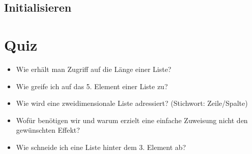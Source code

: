 \subsection{Initialisieren}
\begin{frame}
	\slidehead
	\vskip -12pt
\end{frame}

\subsection{}
\livecoding

\section{Quiz}
\begin{frame}
	\slidehead

	\begin{itemize}
		\item Wie erhält man Zugriff auf die Länge einer Liste?
		\pause
		\item Wie greife ich auf das 5. Element einer Liste zu?
		\pause
		\item Wie wird eine zweidimensionale Liste adressiert? (Stichwort: Zeile/Spalte)
		\pause
		\item Wofür benötigen wir  und warum erzielt eine einfache Zuweisung
		nicht den gewünschten Effekt?
		\pause
		\item Wie schneide ich eine Liste hinter dem 3. Element ab?
	\end{itemize}
\end{frame}


